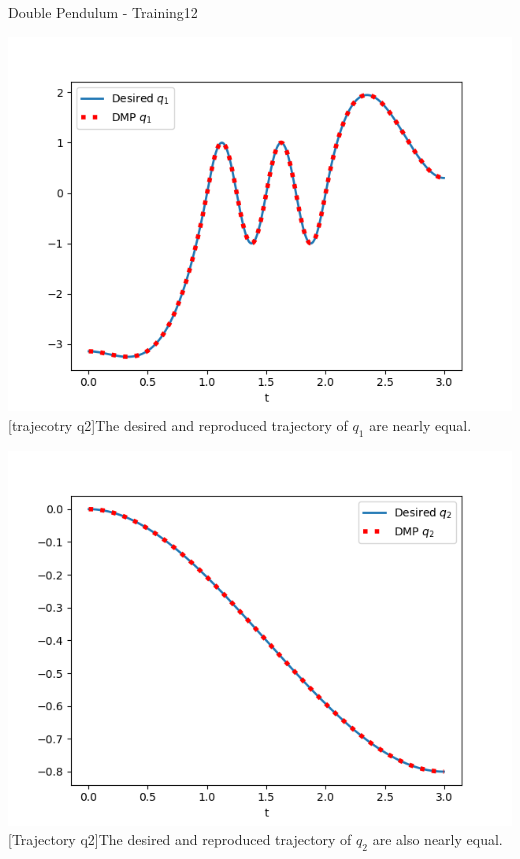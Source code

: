 \begin{questions}
\begin{question}{Double Pendulum - Training}{12}
\begin{answer}
\begin{center}
	\begin{minipage}{0.45\linewidth} 
		\centering
		\includegraphics[width=\linewidth]{img/2c-q1.png}
		[trajecotry q2]{The desired and reproduced trajectory of $q_1$ are nearly equal.}
		\label{fig:q1_des}
	\end{minipage}
	\hfill
	\begin{minipage}{0.45\linewidth} 
		\centering
		\includegraphics[width=\linewidth]{img/2c-q2.png}
		[Trajectory q2]{The desired and reproduced trajectory of $q_2$ are also nearly equal.}
		\label{fig:q2_des}
	\end{minipage}
\end{center}


\end{answer}
\end{question}
\end{questions}
